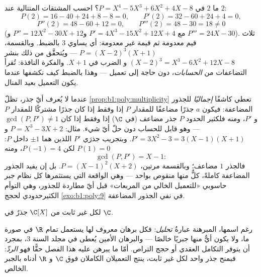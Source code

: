\begin{example}\label{ex:b1:poly:multexample}
ما  $2$ في $P = X^4 - 5X^3 + 6X^2
+ 4X - 8$؟ احسب المشتقات المتتالية عند $2$:
\[
P(2) = 16 - 40 + 24 + 8 - 8 = 0, \qquad
P'(2) = 32 - 60 + 24 + 4 = 0,
\]
\[
P''(2) = 48 - 60 + 12 = 0, \qquad
P'''(2) = 48 - 30 = 18 \neq 0
\]
(مع $P' = 4X^3 - 15X^2 + 12X + 4$ و$P'' = 12X^2 - 30X + 12$ و
$P''' = 24X - 30$). ثلاث قيم معدومة ثم قيمة غير معدومة:
أي  يساوي $3$ بالضبط. وبالقسمة، $P = (X - 2)^3(X + 1)$ ---
ويُتحقَّق من ذلك بنشر $(X-2)^3 = X^3 - 6X^2 + 12X - 8$ و
الضرب في $X + 1$. والفكرة النافذة: تُقرأ التضاعفات من
\emph{الحسابات}، دون حاجة إلى تعميل --- وهذا بالضبط
كيف نكشفها عندما يكون التعميل بعيد المنال.
\end{example}

\begin{example}\label{ex:b1:poly:gcdmultiple}
عندما لا يُعرف أيّ جذر، تظلّ \cref{prop:b1:poly:multiplicity}
تعطي كاشفًا \emph{إجماليًا} للجذور المضاعفة: فيكون $a$ جذرًا
مضاعفًا للمقدار $P$ إذا وفقط إذا كان جذرًا مشتركًا للمقدار $P$ و $P'$، ومنه فلكثير الحدود $P$
جذر مضاعف (في $\C$) إذا وفقط إذا كان $\gcd(P, P') \neq 1$ --- وهو قابل للحساب
 دون حلّ أيّ شيء. مثال: $P =
X^3 - 3X + 2$ و$P' = 3X^2 - 3 = 3(X - 1)(X + 1)$. وبتجريب
جذرَي $P'$ اللذين هما $\pm1$ داخل $P$: $P(1) = 0$ لكن $P(-1) = 4$، ومنه
\[
\gcd(P, P') = X - 1 :
\]
فالجذر $1$ مضاعف؛ وبالقسمة مرتين، $P = (X - 1)^2(X + 2)$.
بل إن  يفيد  الجذور المضاعفة كاملةً، كلٌّ منها
 منقوص بواحد --- وهي الواقعة التي يستثمرها كل نظام جبر
حاسوبي «للتعميل الخالي من المربعات» قبل أيّ
مطاردة للجذور، وهي التوأم الكثيرحدودي لحجج
\cref{exo:b1:poly:9} في نفي الجذور المضاعفة.
\end{example}

\begin{theorem}\label{thm:b1:poly:fta}
لكل  غير ثابت من $\C[X]$ جذرٌ في
$\C$.
\end{theorem}
\admitted

\begin{remark}
رغم اسمها، المبرهنة عبارةُ \emph{تحليل}:
فكل برهان معروف لها يستعمل تمام $\R$ في صورة ما، ولا
يكون أيٌّ منها جبريًا خالصًا --- والبرهان الأمين يُعطى في
مجلد السنة 3، بمجرد أن يتوفر التكامل العقدي أو حجج
التراص. أمّا ما يبرهن عليه هذا الفصل حقًّا فهو
\emph{الردّ}: فبمنح جذر واحد لكل 
غير ثابت، ينتج التعميلان الكاملان فوق $\C$ و $\R$ أدناه
بالجبر الخالص.
\end{remark}

